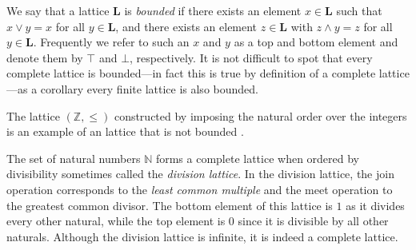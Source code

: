We say that a lattice $\mathbf{L}$ is \textit{bounded} if there exists an element $x \in \mathbf{L}$ such that $x \vee y = x$ for all $y \in \mathbf{L}$, and there exists an element $z \in \mathbf{L}$ with $z \wedge y = z$ for all $y \in \mathbf{L}$. Frequently we refer to such an $x$ and $y$ as a top and bottom element and denote them by $\top$ and $\bot$, respectively. It is not difficult to spot that every complete lattice is bounded---in fact this is true by definition of a complete lattice---as a corollary every finite lattice is also bounded. 

The lattice $(\mathbb{Z}, \leq)$ constructed by imposing the natural order over the integers is an example of an lattice that is not bounded \cite[p. 36]{davey2002introduction}. 

\begin{example}
\label{example:lattice of naturals}
The set of natural numbers $\mathbb{N}$ forms a complete lattice when ordered by divisibility sometimes called the \textit{division lattice}. In the division lattice, the join operation corresponds to the \textit{least common multiple} and the meet operation to the greatest common divisor. The bottom element of this lattice is $1$ as it divides every other natural, while the top element is $0$ since it is divisible by all other naturals. Although the division lattice is infinite, it is indeed a complete lattice. 
\begin{figure}[H]
  \centering
\end{figure}
\end{example}
